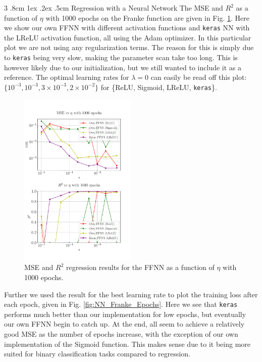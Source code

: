 \documentclass[%
reprint,s
amsmath,amssymb,
aps,
]{revtex4-2}
\makeatletter
\renewcommand{\subsubsection}{%
	\@startsection
	{subsubsection}%
	{3}%
	{\z@}%
	{.8cm \@plus1ex \@minus .2ex}%
	{.5cm}%
	{\normalfont\small\centering}%
}
\makeatother
\begin{document}
\subsubsection{Regression with a Neural Network}
The MSE and $R^2$ as a function of $\eta$ with 1000 epochs on the Franke function are given in Fig. \ref{fig:NN_Franke_LR_1000}. Here we show our own FFNN with different activation functions and \texttt{keras} NN with the LReLU activation function, all using the Adam optimizer. In this particular plot we are not using any regularization terms. The reason for this is simply due to \texttt{keras} being very slow, making the parameter scan take too long. This is however likely due to our initialization, but we still wanted to include it as a reference. The optimal learning rates for $\lambda=0$ can easily be read off this plot: $\{10^{-3},10^{-3},3\times10^{-3},2\times 10^{-2}\}$ for \{ReLU, Sigmoid, LReLU, \texttt{keras}\}.
\begin{figure}[ht!]
	\includegraphics[width=0.5\textwidth]{Figures/NN_MSE_R2_Franke_LearningRate_Epochs1000.pdf}
	\caption{MSE and $R^2$ regression results for the FFNN as a function of $\eta$ with 1000 epochs.}
	\label{fig:NN_Franke_LR_1000}
\end{figure}

Further we used the result for the best learning rate to plot the training loss after each epoch, given in Fig. \ref{fig:NN_Franke_Epochs}. Here we see that \texttt{keras} performs much better than our implementation for low epochs, but eventually our own FFNN begin to catch up. At the end, all seem to achieve a relatively good MSE as the number of epochs increase, with the exception of our own implementation of the Sigmoid function. This makes sense due to it being more suited for binary classification tasks compared to regression.
\end{document}

